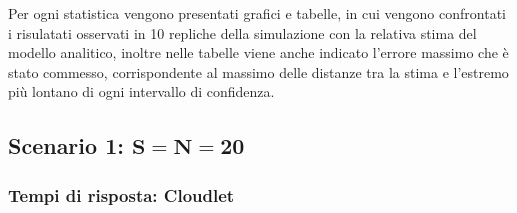 Per ogni statistica vengono presentati grafici e tabelle, in cui vengono
confrontati i risulatati osservati in 10 repliche della simulazione con la
relativa stima del modello analitico, inoltre nelle tabelle viene anche indicato
l'errore massimo che è stato commesso, corrispondente al massimo delle distanze 
tra la stima e l'estremo più lontano di ogni intervallo di confidenza.
%
%
\subsection{Scenario 1: $\mathbf{S=N=20}$}
\subsubsection{Tempi di risposta: Cloudlet}
%
